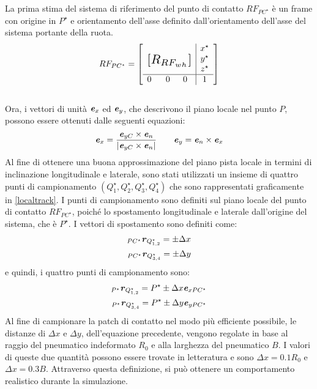 %
\noindent
La prima stima del sistema di riferimento del punto di contatto $RF_{PC^\star}$ è un frame con origine in $P^\star$ e orientamento dell'asse definito dall'orientamento dell'asse del sistema portante della ruota.
%
\begin{equation}
RF_{PC^\star} = \left[
\begin{array}{ccc|c}
& & & x^\star\\
\multicolumn{3}{c|}{\multirow{3}{*}{\raisebox{20mm}{\scalebox{1.5}{$[R_{RF_{wh}}]$}}}} & y^\star\\
& & & z^\star\\ \hline
0 & ~~0 & 0 & 1
\end{array}\right]
\end{equation}\\
%
Ora, i vettori di unità $\textbf{\textit{e}}_x$ ed $\textbf{\textit{e}}_y$, che descrivono il piano locale nel punto $P$, possono essere ottenuti dalle seguenti equazioni:
%
\begin{equation}
\textbf{\textit{e}}_x = \frac{\textbf{\textit{e}}_{yC}\times\textbf{\textit{e}}_{n}}{|\textbf{\textit{e}}_{yC}\times\textbf{\textit{e}}_{n}|}
\qquad
\textbf{\textit{e}}_{y} = \textbf{\textit{e}}_{n}\times\textbf{\textit{e}}_{x}
\end{equation}
%
Al fine di ottenere una buona approssimazione del piano pista locale in termini di inclinazione longitudinale e laterale, sono stati utilizzati un insieme di quattro punti di campionamento $(Q^\star_1, Q^\star_2, Q^\star_3, Q^\star_4)$ che sono rappresentati graficamente in \figurename{ \ref{localtrack}}. I punti di campionamento sono definiti sul piano locale del punto di contatto $RF_{PC^\star}$, poiché lo spostamento longitudinale e laterale dall'origine del sistema, che è $P^\star$. I vettori di spostamento sono definiti come:
%
\begin{equation}
\begin{split}
_{PC^\star}\textbf{\textit{r}}_{Q^\star_{1,2}} = \pm \Delta x \\
_{PC^\star}\textbf{\textit{r}}_{Q^\star_{3,4}} = \pm \Delta y
\end{split}
\end{equation}
%
e quindi, i quattro punti di campionamento sono:
%
\begin{equation}
\begin{split}
_{P^\star}\textbf{\textit{r}}_{Q^\star_{1,2}} = P^\star \pm \Delta x \textbf{\textit{e}}_{xPC^\star} \\
_{P^\star}\textbf{\textit{r}}_{Q^\star_{3,4}} = P^\star \pm \Delta y \textbf{\textit{e}}_{yPC^\star}
\end{split}
\end{equation}
%
Al fine di campionare la patch di contatto nel modo più efficiente possibile, le distanze di $\Delta x$ e $\Delta y$, dell'equazione precedente, vengono regolate in base al raggio del pneumatico indeformato $R_0$ e alla larghezza del pneumatico $B$. I valori di queste due quantità possono essere trovate in letteratura e sono $\Delta x = 0.1 R_0$ e $\Delta x = 0.3 B$. Attraverso questa definizione, si può ottenere un comportamento realistico durante la simulazione.

